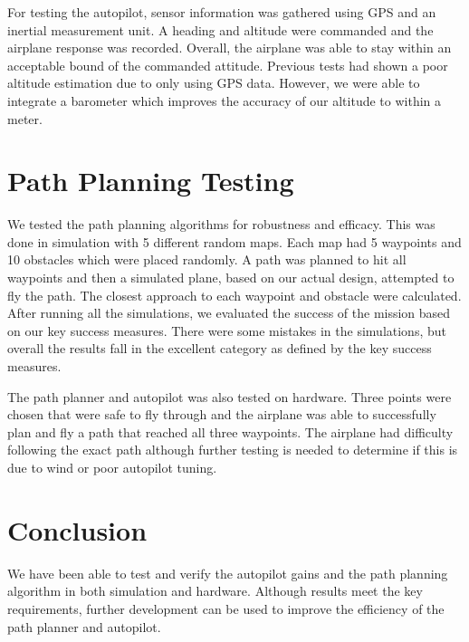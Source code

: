 \documentclass[]{auvsi_doc}
\begin{document}
For testing the autopilot, sensor information was gathered using GPS and an inertial measurement unit. A heading and altitude were commanded and the airplane response was recorded. Overall, the airplane was able to stay within an acceptable bound of the commanded attitude. Previous tests had shown a poor altitude estimation due to only using GPS data. However, we were able to integrate a barometer which improves the accuracy of our altitude to within a meter.

\section{Path Planning Testing}

We tested the path planning algorithms for robustness and efficacy. This was done in simulation with 5 different random maps. Each map had 5 waypoints and 10 obstacles which were placed randomly. A path was planned to hit all waypoints and then a simulated plane, based on our actual design, attempted to fly the path. The closest approach to each waypoint and obstacle were calculated. After running all the simulations, we evaluated the success of the mission based on our key success measures. There were some mistakes in the simulations, but overall the results fall in the excellent category as defined by the key success measures.

The path planner and autopilot was also tested on hardware. Three points were chosen that were safe to fly through and the airplane was able to successfully plan and fly a path that reached all three waypoints. The airplane had difficulty following the exact path although further testing is needed to determine if this is due to wind or poor autopilot tuning. 

\section{Conclusion}

We have been able to test and verify the autopilot gains and the path planning algorithm in both simulation and hardware. Although results meet the key requirements, further development can be used to improve the efficiency of the path planner and autopilot.
\end{document}
